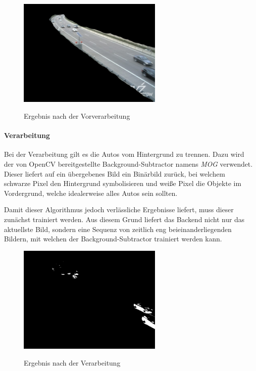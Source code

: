 \begin{figure}[ht]
   \centering
     \includegraphics[width=7cm]{Bilder/process/2} \\
 \caption{Ergebnis nach der Vorverarbeitung}
\end{figure}

\paragraph*{Verarbeitung}
Bei der Verarbeitung gilt es die Autos vom Hintergrund zu trennen. Dazu wird der von OpenCV bereitgestellte Background-Subtractor namens {\em MOG} verwendet.
Dieser liefert auf ein übergebenes Bild ein Binärbild zurück, bei welchem schwarze Pixel den Hintergrund symbolisieren und weiße Pixel die Objekte im Vordergrund, welche idealerweise alles Autos sein sollten.

Damit dieser Algorithmus jedoch verlässliche Ergebnisse liefert, muss dieser zunächst trainiert werden. 
Aus diesem Grund liefert das Backend nicht nur das aktuellste Bild, sondern eine Sequenz von zeitlich eng beieinanderliegenden Bildern, mit welchen der Background-Subtractor trainiert werden kann. 

\begin{figure}[ht]
   \centering
     \includegraphics[width=7cm]{Bilder/process/3} \\
 \caption{Ergebnis nach der Verarbeitung}
\end{figure}

